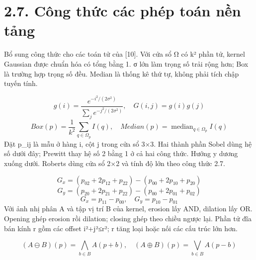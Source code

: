 \documentclass[13pt,a4paper]{extreport}
\begin{document}
\section*{2.7. Công thức các phép toán nền tảng}
Bổ sung công thức cho các toán tử của [10]. Với cửa sổ Ω có k² phần tử, kernel Gaussian được chuẩn hóa có tổng bằng 1. σ lớn làm trọng số trải rộng hơn; Box là trường hợp trọng số đều. Median là thống kê thứ tự, không phải tích chập tuyến tính.
\par
\begin{equation}g(i)=\frac{e^{-i^2/(2\sigma^2)}}{\sum_j e^{-j^2/(2\sigma^2)}},\quad G(i,j)=g(i)g(j)\tag{2.10}\end{equation}
\begin{equation}Box(p)=\frac{1}{k^2}\sum_{q\in\Omega_p}I(q),\quad Median(p)=\operatorname{median}_{q\in\Omega_p}I(q)\tag{2.11}\end{equation}
Đặt p\_ij là mẫu ở hàng i, cột j trong cửa sổ 3×3. Hai thành phần Sobel dùng hệ số dưới đây; Prewitt thay hệ số 2 bằng 1 ở cả hai công thức. Hướng y dương xuống dưới. Roberts dùng cửa sổ 2×2 và tính độ lớn theo công thức 2.7.
\par
\begin{equation}G_x=(p_{02}+2p_{12}+p_{22})-(p_{00}+2p_{10}+p_{20})\tag{2.12}\end{equation}
\begin{equation}G_y=(p_{20}+2p_{21}+p_{22})-(p_{00}+2p_{01}+p_{02})\tag{2.13}\end{equation}
\begin{equation}G_x=p_{11}-p_{00},\quad G_y=p_{10}-p_{01}\tag{2.14}\end{equation}
Với ảnh nhị phân A và tập vị trí B của kernel, erosion lấy AND, dilation lấy OR. Opening ghép erosion rồi dilation; closing ghép theo chiều ngược lại. Phần tử đĩa bán kính r gồm các offset i²+j²≤r²; r tăng loại hoặc nối các cấu trúc lớn hơn.
\par
\begin{equation}(A\ominus B)(p)=\bigwedge_{b\in B}A(p+b),\quad (A\oplus B)(p)=\bigvee_{b\in B}A(p-b)\tag{2.15}\end{equation}
\clearpage
\end{document}
